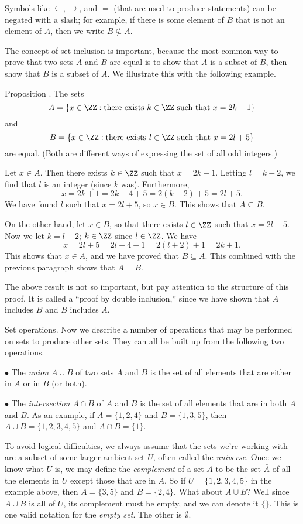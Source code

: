 Symbols like $\subseteq$, $\supseteq$, and $=$ (that are
used to produce statements) can be
negated with a slash; for example, if there is some element of $B$ that is not an element of $A$,
then we write $B\not\subseteq A$.

The concept of set inclusion is important, because
the most common way to prove that two sets $A$ and $B$ are equal is to show that $A$ is a subset of $B$,
then show that $B$ is a subset of $A$. We illustrate this with the following example.

\proclaim Proposition \advthm. The sets
$$A = \{ x\in \ZZ : \hbox{there exists}\ k\in \ZZ\ \hbox{such that}\ x = 2k + 1\}$$
and
$$B = \{ x\in \ZZ : \hbox{there exists}\ l\in \ZZ\ \hbox{such that}\ x = 2l + 5\}$$
are equal. (Both are different ways of expressing the set of all odd integers.)

\proof Let $x\in A$. Then there exists $k\in\ZZ$ such that $x = 2k+1$. Letting $l = k-2$, we find that
$l$ is an integer (since $k$ was). Furthermore,
$$x = 2k+1 = 2k - 4 + 5 = 2(k-2)+5 = 2l+5.$$
We have found $l$ such that $x = 2l+5$, so $x\in B$. This shows that $A\subseteq B$.

On the other hand, let $x\in B$, so that there exists $l\in \ZZ$ such that $x = 2l+5$. Now we let $k = l+2$;
$k\in \ZZ$ since $l\in \ZZ$. We have
$$x = 2l+5 = 2l + 4 + 1 = 2(l+2) + 1 = 2k+1.$$
This shows that $x\in A$, and we have proved that $B\subseteq A$. This combined with the previous paragraph
shows that $A = B$.\slug

The above result is not so important, but pay attention to the structure of this proof. It is called a ``proof
by double inclusion,'' since we have shown that $A$ includes $B$ and $B$ includes $A$.

\medskip\boldlabel Set operations.
Now we describe a number of operations that may be performed on sets to produce other sets. They can all be
built up from the following two operations.
\medskip
\item{$\bullet$} The {\it union} $A\cup B$ of two sets $A$ and $B$ is the set of all elements that are either in
$A$ or in $B$ (or both).
\smallskip
\item{$\bullet$} The {\it intersection} $A\cap B$ of $A$ and $B$ is the set of all elements that are in both $A$
and $B$.
\medskip
As an example, if $A = \{1,2,4\}$ and $B = \{1,3,5\}$, then $A\cup B = \{1,2,3,4,5\}$ and $A\cap B = \{1\}$.

To avoid logical difficulties, we always assume that the sets we're working with are a subset of some
larger ambient set $U$, often called the {\it universe}.
Once we know what $U$ is, we may define the {\it complement}
of a set $A$ to be the set $\bar A$ of all the elements in $U$ except those that are in $A$.
So if $U = \{1,2,3,4,5\}$ in the example above, then $\bar A = \{3,5\}$ and $\bar B = \{2,4\}$.
What about $\bar{A\cup B}$? Well since $A\cup B$ is all of $U$, its complement must be empty, and we can denote
it $\{\}$. This is one valid notation for the {\it empty set}. The other is $\emptyset$.

